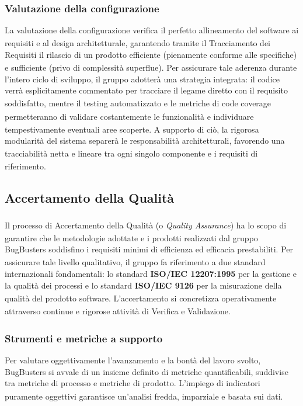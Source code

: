 \documentclass[a4paper,11pt]{article}
\newcommand{\G}{\textsubscript{\scalebox{0.6}{\textbf{G}}}}
\begin{document}
\subsubsection{Valutazione della configurazione}
La valutazione della configurazione verifica\G{} il perfetto allineamento del software ai requisiti e al design architetturale, garantendo tramite il Tracciamento dei Requisiti il rilascio di un prodotto\G{} efficiente (pienamente conforme alle specifiche) e sufficiente (privo di complessità superflue). Per assicurare tale aderenza durante l'intero ciclo di sviluppo, il gruppo adotterà una strategia integrata: il codice verrà esplicitamente commentato per tracciare il legame diretto con il requisito\G{} soddisfatto, mentre il testing automatizzato e le metriche di code coverage\G{} permetteranno di validare costantemente le funzionalità\G{} e individuare tempestivamente eventuali aree scoperte. A supporto di ciò, la rigorosa modularità\G{} del sistema separerà le responsabilità architetturali, favorendo una tracciabilità\G{} netta e lineare tra ogni singolo componente e i requisiti di riferimento.



\subsection{Accertamento della Qualità\G{}}
Il processo di Accertamento della Qualità\G{} (o \textit{Quality Assurance}) ha lo scopo di garantire che le metodologie adottate e i prodotti realizzati dal gruppo BugBusters soddisfino i requisiti minimi di efficienza\G{} ed efficacia\G{} prestabiliti.
Per assicurare tale livello qualitativo, il gruppo fa riferimento a due standard internazionali fondamentali: lo standard \textbf{ISO/IEC 12207:1995} per la gestione e la qualità\G{} dei processi e lo standard \textbf{ISO/IEC 9126} per la misurazione della qualità\G{} del prodotto\G{} software. L'accertamento si concretizza operativamente attraverso continue e rigorose attività di Verifica\G{} e Validazione\G{}.

\subsubsection{Strumenti e metriche a supporto}
Per valutare oggettivamente l'avanzamento e la bontà del lavoro svolto, BugBusters si avvale di un insieme definito di metriche quantificabili, suddivise tra metriche di processo e metriche di prodotto\G{}. L'impiego di indicatori puramente oggettivi garantisce un'analisi fredda, imparziale e basata sui dati.
\end{document}
